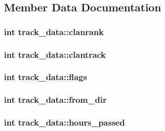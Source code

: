 \subsection{Member Data Documentation}
\hypertarget{structtrack__data_a5fe2d58facd7b6441340aafbeb5854b2}{
\subsubsection[{clanrank}]{\setlength{\rightskip}{0pt plus 5cm}int track\-\_\-data\-::clanrank}}\label{structtrack__data_a5fe2d58facd7b6441340aafbeb5854b2}
\hypertarget{structtrack__data_a39d1099f1c751a13cf5326a1217e8df7}{
\subsubsection[{clantrack}]{\setlength{\rightskip}{0pt plus 5cm}int track\-\_\-data\-::clantrack}}\label{structtrack__data_a39d1099f1c751a13cf5326a1217e8df7}
\hypertarget{structtrack__data_a82bd7b9d90edd63ac1ba44afccf051f5}{
\subsubsection[{flags}]{\setlength{\rightskip}{0pt plus 5cm}int track\-\_\-data\-::flags}}\label{structtrack__data_a82bd7b9d90edd63ac1ba44afccf051f5}
\hypertarget{structtrack__data_ad08d0b43c25fcad25ba82bf68dd00884}{
\subsubsection[{from\-\_\-dir}]{\setlength{\rightskip}{0pt plus 5cm}int track\-\_\-data\-::from\-\_\-dir}}\label{structtrack__data_ad08d0b43c25fcad25ba82bf68dd00884}
\hypertarget{structtrack__data_af4f3d04157357eedd375309185853bd6}{
\subsubsection[{hours\-\_\-passed}]{\setlength{\rightskip}{0pt plus 5cm}int track\-\_\-data\-::hours\-\_\-passed}}\label{structtrack__data_af4f3d04157357eedd375309185853bd6}

